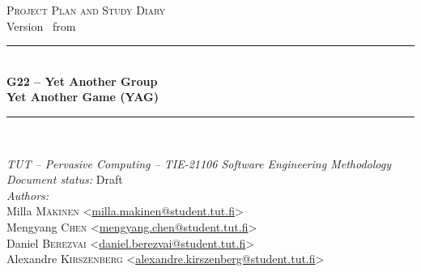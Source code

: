 \begin{titlepage}

\newcommand{\HRule}{\rule{\linewidth}{0.5mm}} %

\center %


\textsc{\Large Project Plan and Study Diary}\\[0.5cm]
{\large Version \vhCurrentVersion ~from \vhCurrentDate}\\[1cm]


\HRule \\[0.4cm]
{ \huge \bfseries G22 – Yet Another Group}\\[0.2cm]
{ \large \bfseries Yet Another Game (YAG)}\\[0.2cm]
\HRule \\[1.5cm]


\begin{minipage}{\textwidth}
\begin{flushleft} \small
\emph{TUT – Pervasive Computing – TIE-21106 Software Engineering Methodology} \\[0.5cm]
\emph{Document status:} Draft \\[0.5cm]
\emph{Authors:}\\
Milla \textsc{Mäkinen} <\href{mailto:milla.makinen@student.tut.fi}{milla.makinen@student.tut.fi}> \\
Mengyang \textsc{Chen} <\href{mailto:mengyang.chen@student.tut.fi}{mengyang.chen@student.tut.fi}> \\
Daniel \textsc{Berezvai} <\href{mailto:daniel.berezvai@student.tut.fi}{daniel.berezvai@student.tut.fi}> \\
Alexandre \textsc{Kirszenberg} <\href{mailto:alexandre.kirszenberg@student.tut.fi}{alexandre.kirszenberg@student.tut.fi}>
\end{flushleft}
\end{minipage}


\end{titlepage}
